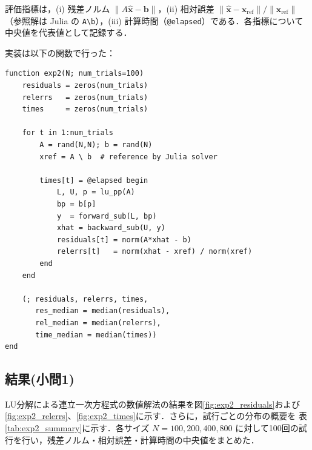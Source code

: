 \documentclass[a4paper,11pt]{ltjsarticle}
\begin{document}
評価指標は，(i) 残差ノルム $\|A\hat{\boldsymbol{x}}-\boldsymbol{b}\|$，(ii) 相対誤差 $\|\hat{\boldsymbol{x}}-\boldsymbol{x}_{\mathrm{ref}}\|/\|\boldsymbol{x}_{\mathrm{ref}}\|$（参照解は Julia の \verb|A\b|），(iii) 計算時間（\verb|@elapsed|）である．各指標について中央値を代表値として記録する．

実装は以下の関数で行った：
\begin{verbatim}
function exp2(N; num_trials=100)
    residuals = zeros(num_trials)
    relerrs   = zeros(num_trials)
    times     = zeros(num_trials)

    for t in 1:num_trials
        A = rand(N,N); b = rand(N)
        xref = A \ b  # reference by Julia solver

        times[t] = @elapsed begin
            L, U, p = lu_pp(A)
            bp = b[p]
            y  = forward_sub(L, bp)
            xhat = backward_sub(U, y)
            residuals[t] = norm(A*xhat - b)
            relerrs[t]   = norm(xhat - xref) / norm(xref)
        end
    end

    (; residuals, relerrs, times,
       res_median = median(residuals),
       rel_median = median(relerrs),
       time_median = median(times))
end
\end{verbatim}

\subsection{結果(小問1)}
LU分解による連立一次方程式の数値解法の結果を図\ref{fig:exp2_residuals}および\ref{fig:exp2_relerrs}、\ref{fig:exp2_times}に示す．さらに，試行ごとの分布の概要を 表\ref{tab:exp2_summary}に示す．各サイズ $N=100, 200, 400, 800$ に対して100回の試行を行い，残差ノルム・相対誤差・計算時間の中央値をまとめた．
\end{document}
